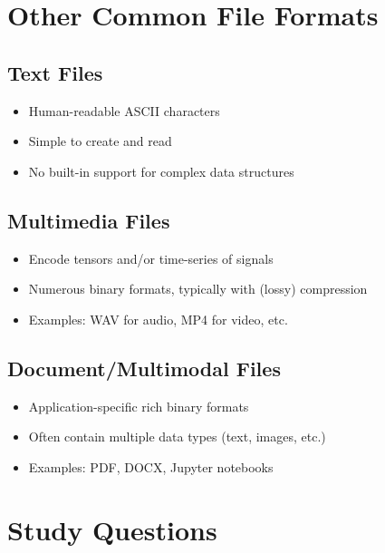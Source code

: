 \documentclass[12pt]{article}
\begin{document}
\section{Other Common File Formats}

\subsection{Text Files}
\begin{itemize}
    \item Human-readable ASCII characters
    \item Simple to create and read
    \item No built-in support for complex data structures
\end{itemize}

\subsection{Multimedia Files}
\begin{itemize}
    \item Encode tensors and/or time-series of signals
    \item Numerous binary formats, typically with (lossy) compression
    \item Examples: WAV for audio, MP4 for video, etc.
\end{itemize}

\subsection{Document/Multimodal Files}
\begin{itemize}
    \item Application-specific rich binary formats
    \item Often contain multiple data types (text, images, etc.)
    \item Examples: PDF, DOCX, Jupyter notebooks
\end{itemize}

\section{Study Questions}
\end{document}
